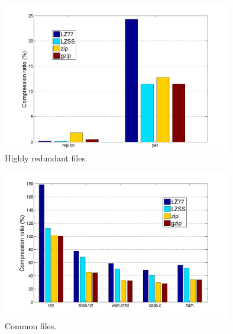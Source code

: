 \begin{center}
\begin{figure}[H]
\includegraphics[width=10cm]{images/bars1.png}
\caption{Highly redundant files.}
\end{figure}
\end{center}

\begin{center}
\begin{figure}[H]
\includegraphics[width=10cm]{images/bars2.png}
\caption{Common files.}
\end{figure}
\end{center}

